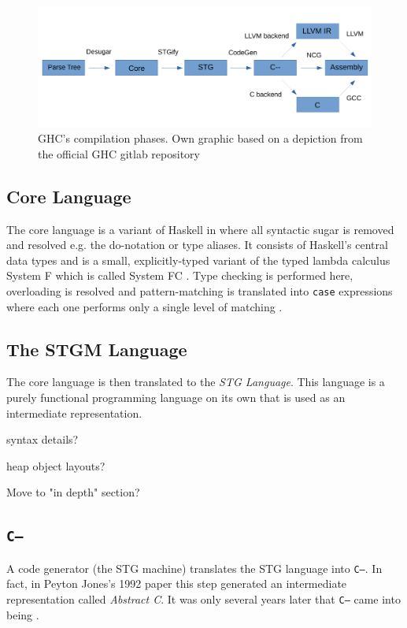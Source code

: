\documentclass[runningheads]{llncs}
\begin{document}
\begin{figure}

\centering
\includegraphics[width=12cm]{ghcflow.pdf}
\caption{GHC's compilation phases. Own graphic based on a depiction from the official GHC gitlab repository \protect\footnotemark}
\label{fig:ghc}
\end{figure}

\subsection{Core Language}
The core language is a variant of Haskell in where all syntactic sugar is removed and resolved e.g. the do-notation or type aliases. It consists of Haskell's central data types and is a small, explicitly-typed variant of the typed lambda calculus System F \cite{girard1986system} which is called System FC \cite{sulzmann2007system}. Type checking is performed here, overloading is resolved and pattern-matching is translated into \texttt{case} expressions where each one performs only a single level of matching \cite{jones1992implementing}.

\subsection{The STGM Language}
The core language is then translated to the \textit{STG Language}.
This language is a purely functional programming language on its own that is used as an intermediate representation.

syntax details?

heap object layouts?


Move to "in depth" section?

\subsection{\texttt{C--}}
\label{subsec:C--}

A code generator (the STG machine) translates the STG language into \texttt{C--}. In fact, in Peyton Jones's 1992 paper \cite{jones1992implementing} this step generated an intermediate representation called \textit{Abstract C}. It was only several years later that \texttt{C--} came into being \cite{jones1999c}.
\end{document}
